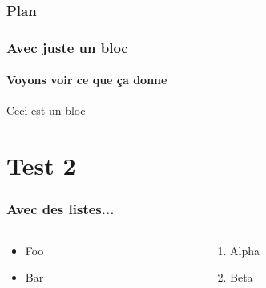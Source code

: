 \documentclass[aspectratio=169, usepdftitle=false, xcolor={dvipsnames}, 9pt]{beamer}
\begin{document}
\begin{frame}[t]
    \frametitle{Plan}
    \tableofcontents[currentsection]
\end{frame}

\begin{frame}[c]
    \frametitle{Avec juste un bloc}
    \framesubtitle{Voyons voir ce que ça donne}
    
    \begin{examples}[Test]
       Ceci est un bloc 
    \end{examples}
\end{frame}

\section{Test 2}

\begin{frame}[c]
    \frametitle{Avec des listes...}
    
    \begin{columns}
        \begin{column}{0.5\textwidth}
            \begin{itemize}
                \item Foo
                \item Bar
            \end{itemize}
        \end{column}
        \begin{column}{0.5\textwidth}
           \begin{enumerate}
               \item Alpha
               \item Beta
           \end{enumerate} 
        \end{column}
    \end{columns}
\end{frame}
\end{document}
